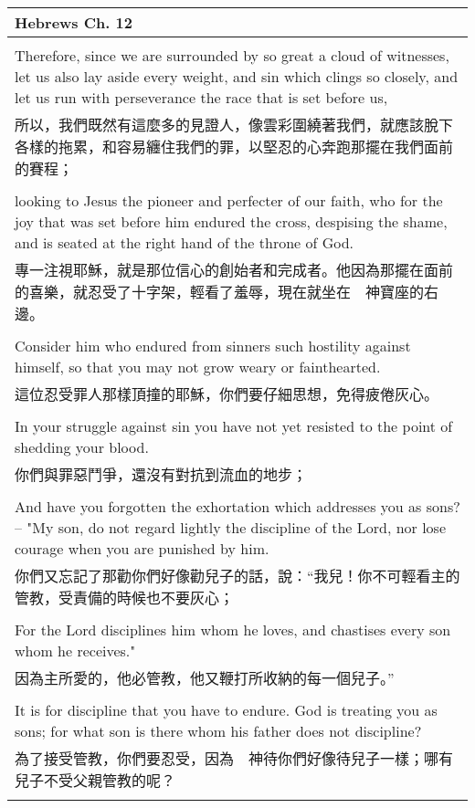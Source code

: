 \begin{tabularx}{\textwidth}{p{}}
\hline
Hebrews Ch. 12 \\
\hline \\
Therefore, since we are surrounded by so great a cloud of witnesses, let us also lay aside every weight, and sin which clings so closely, and let us run with perseverance the race that is set before us, \\
所以，我們既然有這麼多的見證人，像雲彩圍繞著我們，就應該脫下各樣的拖累，和容易纏住我們的罪，以堅忍的心奔跑那擺在我們面前的賽程； \\ \\
looking to Jesus the pioneer and perfecter of our faith, who for the joy that was set before him endured the cross, despising the shame, and is seated at the right hand of the throne of God. \\
專一注視耶穌，就是那位信心的創始者和完成者。他因為那擺在面前的喜樂，就忍受了十字架，輕看了羞辱，現在就坐在　神寶座的右邊。 \\ \\
Consider him who endured from sinners such hostility against himself, so that you may not grow weary or fainthearted. \\
這位忍受罪人那樣頂撞的耶穌，你們要仔細思想，免得疲倦灰心。 \\ \\
In your struggle against sin you have not yet resisted to the point of shedding your blood. \\
你們與罪惡鬥爭，還沒有對抗到流血的地步； \\ \\
And have you forgotten the exhortation which addresses you as sons? -- "My son, do not regard lightly the discipline of the Lord, nor lose courage when you are punished by him. \\
你們又忘記了那勸你們好像勸兒子的話，說：“我兒！你不可輕看主的管教，受責備的時候也不要灰心； \\ \\
For the Lord disciplines him whom he loves, and chastises every son whom he receives." \\
因為主所愛的，他必管教，他又鞭打所收納的每一個兒子。” \\ \\
It is for discipline that you have to endure. God is treating you as sons; for what son is there whom his father does not discipline? \\
為了接受管教，你們要忍受，因為　神待你們好像待兒子一樣；哪有兒子不受父親管教的呢？ \\ \\

\end{tabularx}
